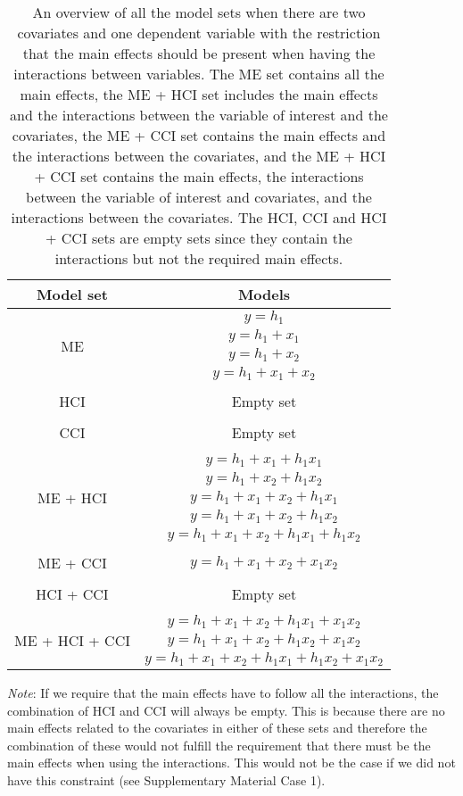 \begin{table}[hbt!]
\centering
\caption{}
\caption*{\footnotesize An overview of all the model sets when there are two covariates and one dependent variable with the restriction that the main effects should be present when having the interactions between variables. The ME set contains all the main effects, the ME + HCI set includes the main effects and the interactions between the variable of interest and the covariates, the ME + CCI set contains the main effects and the interactions between the covariates, and the ME + HCI + CCI set contains the main effects, the interactions between the variable of interest and covariates, and the interactions between the covariates. The HCI, CCI and HCI + CCI sets are empty sets since they contain the interactions but not the required main effects.}
\begin{threeparttable}
\begin{tabular}{cc}
\toprule
Model set & Models \\ 
\midrule
\multirow{4}{*}{ME} & $y=h_1$ \\ & $y=h_1+x_1$ \\ & $y=h_1+x_2$ \\ & $y=h_1+x_1+x_2$  \\ & \\
\multirow{1}{*}{HCI} & Empty set  \\& \\
CCI & Empty set  \\ & \\
\multirow{5}{*}{ME + HCI} & $y=h_1+x_1+h_1x_1$  \\ & $y=h_1+x_2+h_1x_2$  \\& $y=h_1+x_1+x_2+h_1x_1$  \\& $y=h_1+x_1+x_2+h_1x_2$  \\& $y=h_1+x_1+x_2+h_1x_1+h_1x_2$ \\ & \\
ME + CCI & $y=h_1+x_1+x_2+x_1x_2$ \\ & \\
HCI + CCI & Empty set \\ & \\
\multirow{3}{*}{ME + HCI + CCI} & $y=h_1+x_1+x_2+h_1x_1+x_1x_2$ \\ & $y=h_1+x_1+x_2+h_1x_2+x_1x_2$ \\ & $y=h_1+x_1+x_2+h_1x_1+h_1x_2+x_1x_2$ \\
\bottomrule
\end{tabular}
\begin{tablenotes}
\textit{Note}: If we require that the main effects have to follow all the interactions, the combination of HCI and CCI will always be empty. This is because there are no main effects related to the covariates in either of these sets and therefore the combination of these would not fulfill the requirement that there must be the main effects when using the interactions. This would not be the case if we did not have this constraint (see Supplementary Material Case 1).
\end{tablenotes}
\end{threeparttable}
\end{table}


